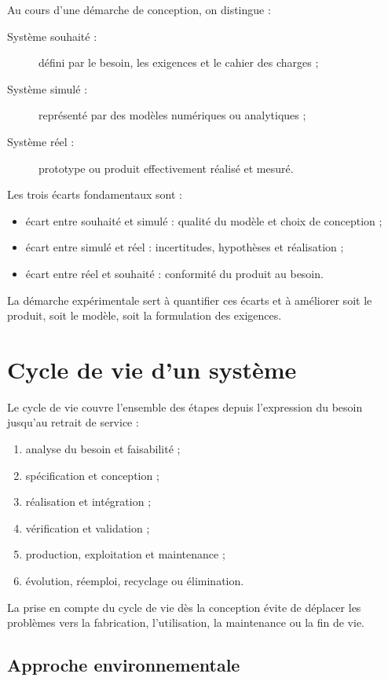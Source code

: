 Au cours d'une démarche de conception, on distingue :
\begin{description}
  \item[Système souhaité :] défini par le besoin, les exigences et le cahier des charges ;
  \item[Système simulé :] représenté par des modèles numériques ou analytiques ;
  \item[Système réel :] prototype ou produit effectivement réalisé et mesuré.
\end{description}

\ISTriangleSystemes

Les trois écarts fondamentaux sont :
\begin{itemize}
  \item écart entre souhaité et simulé : qualité du modèle et choix de conception ;
  \item écart entre simulé et réel : incertitudes, hypothèses et réalisation ;
  \item écart entre réel et souhaité : conformité du produit au besoin.
\end{itemize}

La démarche expérimentale sert à quantifier ces écarts et à améliorer soit le produit, soit le modèle, soit la formulation des exigences.

\section{Cycle de vie d'un système}\label{sec:is-cycle-vie}

Le cycle de vie couvre l'ensemble des étapes depuis l'expression du besoin jusqu'au retrait de service :
\begin{enumerate}
  \item analyse du besoin et faisabilité ;
  \item spécification et conception ;
  \item réalisation et intégration ;
  \item vérification et validation ;
  \item production, exploitation et maintenance ;
  \item évolution, réemploi, recyclage ou élimination.
\end{enumerate}

La prise en compte du cycle de vie dès la conception évite de déplacer les problèmes vers la fabrication, l'utilisation, la maintenance ou la fin de vie.

\subsection{Approche environnementale}

